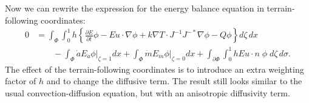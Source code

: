 \documentclass{article}
\theoremstyle{definition}
\theoremstyle{plain}
\begin{document}
Now we can rewrite the expression for the energy balance equation in terrain-following coordinates:
\begin{align}
    0 & = \int_\Phi\int_0^1 h\left\{\frac{\partial E}{\partial t}\phi - Eu\cdot\nabla\phi + k\nabla T\cdot J^{-1}J^{-*}\nabla\phi - Q\phi\right\}d\zeta\,dx \\
    & \qquad - \int_\Phi\dot aE_{\dot a}\phi\Big|_{\zeta=1} dx + \int_\Phi\dot mE_{\dot m}\phi\Big|_{\zeta = 0}dx + \int_{\partial\Phi}\int_0^1 hEu\cdot n\;\phi\;d\zeta\,d\sigma.
\end{align}
The effect of the terrain-following coordinates is to introduce an extra weighting factor of $h$ and to change the diffusive term.
The result still looks similar to the usual convection-diffusion equation, but with an anisotropic diffusivity term.


\pagebreak



\end{document}
